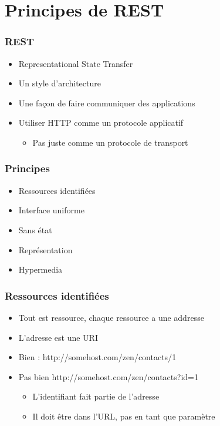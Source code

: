 \section{Principes de REST}


\begin{frame}
 \frametitle{REST}
 \begin{itemize}
  \item Representational State Transfer
  \item Un style d'architecture
  \item Une façon de faire communiquer des applications
  \item Utiliser HTTP comme un protocole applicatif
  \begin{itemize}
   \item Pas juste comme un protocole de transport
  \end{itemize}
 \end{itemize}
\end{frame}

\begin{frame}
 \frametitle{Principes}
 
 \begin{itemize}
  \item Ressources identifiées
  \item Interface uniforme
  \item Sans état
  \item Représentation
  \item Hypermedia
 \end{itemize} 

\end{frame}

\begin{frame}
 \frametitle{Ressources identifiées}
 
 \begin{itemize}
  \item Tout est ressource, chaque ressource a une addresse
  \item L'adresse est une URI
  \item Bien : http://somehost.com/zen/contacts/1
  \item Pas bien http://somehost.com/zen/contacts?id=1
  \begin{itemize}
   \item L'identifiant fait partie de l'adresse
   \item Il doit être dans l'URL, pas en tant que paramètre
  \end{itemize}
 \end{itemize} 

\end{frame}

